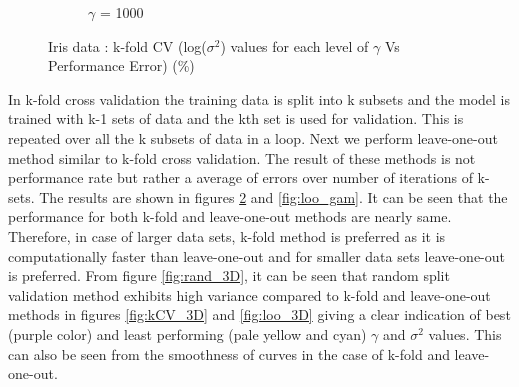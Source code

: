 \documentclass[12pt]{report}
\begin{document}
{\begin{figure}[!ht]
\begin{floatrow}
{\begin{subfigure}{.3\textwidth}
				\caption{$\gamma$ = 1000}
				\label{fig:kCV_gamma(1000)}
			\end{subfigure}%
		}{%
			\caption{Iris data : k-fold CV (log($\sigma^2$) values for each level of $\gamma$ Vs Performance Error)  (\%)}\label{fig:kCV_gam}
		}
	\end{floatrow}
\end{figure}
In k-fold cross validation the training data is split into k subsets and the model is trained with k-1 sets of data and the kth set is used for validation. This is repeated over all the k subsets of data in a loop. Next we perform leave-one-out method similar to k-fold cross validation. The result of these methods is not performance rate but rather a average of errors over number of iterations of k-sets. The results are shown in figures \ref{fig:kCV_gam} and \ref{fig:loo_gam}. It can be seen that the performance for both k-fold and leave-one-out methods are nearly same. Therefore, in case of larger data sets, k-fold method is preferred as it is computationally faster than leave-one-out and for smaller data sets leave-one-out is preferred. From figure \ref{fig:rand_3D}, it can be seen that random split validation method exhibits high variance compared to k-fold and leave-one-out methods in figures \ref{fig:kCV_3D} and \ref{fig:loo_3D} giving a clear indication of best (purple color) and least performing (pale yellow and cyan) $\gamma$ and $\sigma^2$ values.  This can also be seen from the smoothness of curves in the case of k-fold and leave-one-out.\\

}
\end{document}
